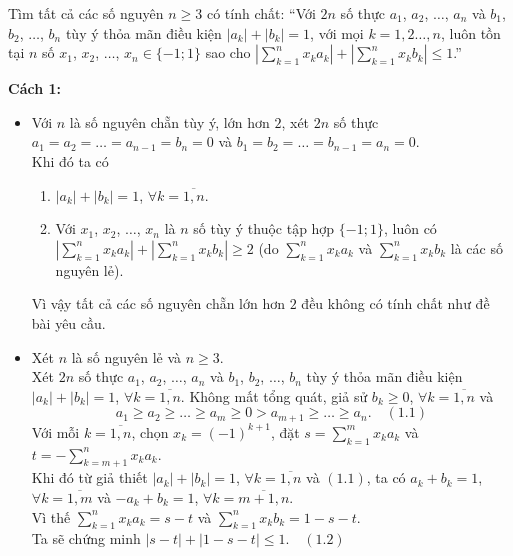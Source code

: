\begin{bt}%
	Tìm tất cả các số nguyên $n\ge3$ có tính chất: ``Với $2n$ số thực $a_1$, $a_2$, $\ldots$, $a_n$ và $b_1$, $b_2$, $\ldots$, $b_n$ tùy ý thỏa mãn điều kiện $\left|a_k\right|+\left|b_k\right|=1$, với mọi $k=1,2\ldots,n$, luôn tồn tại $n$ số $x_1$, $x_2$, $\ldots$, $x_n\in\{-1;1\}$ sao cho $\left|\displaystyle\sum\limits_{k=1}^nx_ka_k\right|+\left|\displaystyle\sum\limits_{k=1}^nx_kb_k\right|\le1$.''
	\loigiai
	{\textbf{Cách 1:}
		\begin{itemize}
			\item Với $n$ là số nguyên chẵn tùy ý, lớn hơn $2$, xét $2n$ số thực $a_1=a_2=\ldots=a_{n-1}=b_n=0$ và $b_1=b_2=\ldots=b_{n-1}=a_n=0$.\\
			Khi đó ta có 
			\begin{enumerate}[1)]
				\item $\left|a_k\right|+\left|b_k\right|=1$, $\forall k=\overline{1,n}$.
				\item Với $x_1$, $x_2$, $\ldots$, $x_n$ là $n$ số tùy ý thuộc tập hợp $\{-1;1\}$, luôn có $\left|\displaystyle\sum\limits_{k=1}^nx_ka_k\right|+\left|\displaystyle\sum\limits_{k=1}^nx_kb_k\right|\ge2$ (do $\displaystyle\sum\limits_{k=1}^nx_ka_k$ và $\displaystyle\sum\limits_{k=1}^nx_kb_k$ là các số nguyên lẻ).\\
			\end{enumerate}
			Vì vậy tất cả các số nguyên chẵn lớn hơn $2$ đều không có tính chất như đề bài yêu cầu.
			\item Xét $n$ là số nguyên lẻ và $n\ge3$.\\
			Xét $2n$ số thực $a_1$, $a_2$, $\ldots$, $a_n$ và $b_1$, $b_2$, $\ldots$, $b_n$ tùy ý thỏa mãn điều kiện $\left|a_k\right|+\left|b_k\right|=1$, $\forall k=\overline{1,n}$. Không mất tổng quát, giả sử $b_k\ge0$, $\forall k=\overline{1,n}$ và $$a_1\ge a_2\ge\ldots\ge a_m\ge0>a_{m+1}\ge\ldots\ge a_n.\quad(1.1)$$
			Với mỗi $k=\overline{1,n}$, chọn $x_k=(-1)^{k+1}$, đặt $s=\displaystyle\sum\limits_{k=1}^mx_ka_k$ và $t=-\displaystyle\sum\limits_{k=m+1}^nx_ka_k$.\\
			Khi đó từ giả thiết $\left|a_k\right|+\left|b_k\right|=1$, $\forall k=\overline{1,n}$ và $(1.1)$, ta có $a_k+b_k=1$, $\forall k=\overline{1,m}$ và $-a_k+b_k=1$, $\forall k=\overline{m+1,n}$.\\
			Vì thế $\displaystyle\sum\limits_{k=1}^nx_ka_k=s-t$ và $\displaystyle\sum\limits_{k=1}^nx_kb_k=1-s-t$.\\
			Ta sẽ chứng minh $|s-t|+|1-s-t|\le1.\quad(1.2)$\\

\end{itemize}}
\end{bt}
